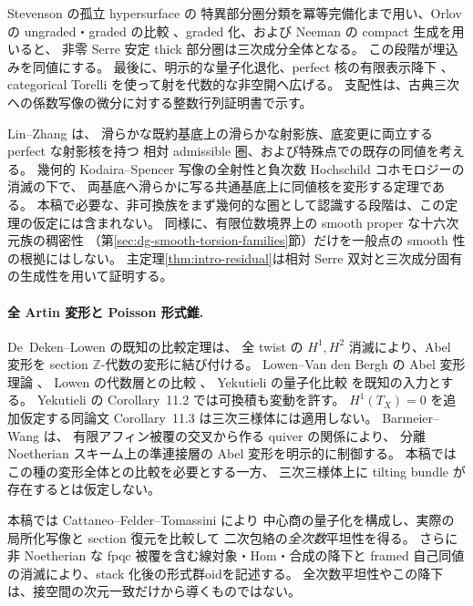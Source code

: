 \documentclass[11pt,a4paper]{ltjsarticle}
\numberwithin{equation}{section}
\begin{document}
Stevenson \cite[Theorems~3.1(3),6.13]{StevensonSingularityActions} の孤立 hypersurface の
特異部分圏分類を冪等完備化まで用い、Orlov の ungraded・graded の比較
\cite[Theorem~3.9]{OrlovLandauGinzburg}
\cite[Theorems~2.5,3.10--3.11]{OrlovSingularities}、graded 化、および
Neeman \cite[Lemma~2.2]{NeemanCompactLocalization} の compact 生成を用いると、
非零 Serre 安定 thick 部分圏は三次成分全体となる。
この段階が埋込みを同値にする。
最後に、明示的な量子化退化、perfect 核の有限表示降下
\cite[Lemma~2.10]{ToenVaquieObjects}、categorical Torelli
\cite{BMMSCubicTorelli}を使って射を代数的な非空開へ広げる。
支配性は、古典三次への係数写像の微分に対する整数行列証明書で示す。

Lin--Zhang \cite[Theorem~1.7 and \S2]{LinZhangDeformingEquivalences} は、
滑らかな既約基底上の滑らかな射影族、底変更に両立する perfect な射影核を持つ
相対 admissible 圏、および特殊点での既存の同値を考える。
幾何的 Kodaira--Spencer 写像の全射性と負次数 Hochschild コホモロジーの消滅の下で、
両基底へ滑らかに写る共通基底上に同値核を変形する定理である。
本稿で必要な、非可換族をまず幾何的な圏として認識する段階は、この定理の仮定には含まれない。
同様に、有限位数境界上の smooth proper な十六次元族の稠密性
（第\ref{sec:dg-smooth-torsion-families}節）だけを一般点の smooth 性の根拠にはしない。
主定理\ref{thm:intro-residual}は相対 Serre 双対と三次成分固有の生成性を用いて証明する。

\paragraph{全 Artin 変形と Poisson 形式錐.}
De~Deken--Lowen \cite[Theorem~4.5]{DeDekenLowen} の既知の比較定理は、
全 twist の $H^1,H^2$ 消滅により、Abel 変形を section $\mathbb Z$-代数の変形に結び付ける。
Lowen--Van den Bergh の Abel 変形理論 \cite{LowenVdBDeformation,LowenVdBHochschild}、
Lowen の代数層との比較 \cite[Theorems~3.14,3.26]{LowenRinged}、
Yekutieli の量子化比較 \cite[Corollary~11.2]{YekutieliTwisted}を既知の入力とする。
Yekutieli の Corollary~11.2 では可換積も変動を許す。
$H^1(T_X)=0$ を追加仮定する同論文 Corollary~11.3 は三次三様体には適用しない。
Barmeier--Wang \cite[Theorems~1.2 and~3.11]{BarmeierWangSheaves} は、
有限アフィン被覆の交叉から作る quiver の関係により、
分離 Noetherian スキーム上の準連接層の Abel 変形を明示的に制御する。
本稿ではこの種の変形全体との比較を必要とする一方、
三次三様体上に tilting bundle が存在するとは仮定しない。

本稿では Cattaneo--Felder--Tomassini \cite[\S3 and Corollary~5.2(iv)]{CFT} により
中心商の量子化を構成し、実際の局所化写像と section 復元を比較して
二次包絡の\emph{全次数}平坦性を得る。
さらに非 Noetherian な fpqc 被覆を含む線対象・Hom・合成の降下と
framed 自己同値の消滅により、stack 化後の形式群oidを記述する。
全次数平坦性やこの降下は、接空間の次元一致だけから導くものではない。
\end{document}
